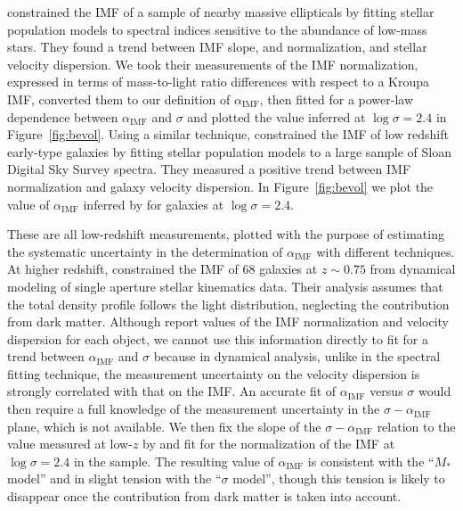 \documentclass[usenatbib, letters]{mnras}
\def\aimf{\alpha_{\mathrm{IMF}}}
\def\Fref#1{Figure~\ref{#1}\xspace}
\begin{document}
{\citet{CvD12} constrained the IMF of a sample of nearby massive ellipticals by fitting stellar population models to spectral indices sensitive to the abundance of low-mass stars. They found a trend between IMF slope, and normalization, and stellar velocity dispersion. We took their measurements of the IMF normalization, expressed in terms of mass-to-light ratio differences with respect to a Kroupa IMF, converted them to our definition of $\aimf$, then fitted for a power-law dependence between $\aimf$ and $\sigma$ and plotted the value inferred at $\log{\sigma}=2.4$ in \Fref{fig:bevol}.
Using a similar technique, \citet{Spi++14} constrained the IMF of low redshift early-type galaxies by fitting stellar population models to a large sample of Sloan Digital Sky Survey spectra.
They measured a positive trend between IMF normalization and galaxy velocity dispersion. In \Fref{fig:bevol} we plot the value of $\aimf$ inferred by \citet{Spi++14} for galaxies at $\log{\sigma} = 2.4$.

These are all low-redshift measurements, plotted with the purpose of estimating the systematic uncertainty in the determination of $\aimf$ with different techniques.
At higher redshift, \citet{S+C14} constrained the IMF of 68 galaxies at $z\sim0.75$ from dynamical modeling of single aperture stellar kinematics data. %
Their analysis assumes that the total density profile follows the light distribution, neglecting the contribution from dark matter.
Although \citet{S+C14} report values of the IMF normalization and velocity dispersion for each object, we cannot use this information directly to fit for a trend between $\aimf$ and $\sigma$ because in dynamical analysis, unlike in the spectral fitting technique, the measurement uncertainty on the velocity dispersion is strongly correlated with that on the IMF. 
An accurate fit of $\aimf$ versus $\sigma$ would then require a full knowledge of the measurement uncertainty in the $\sigma-\aimf$ plane, which is not available. 
We then fix the slope of the $\sigma-\aimf$ relation to the value measured at low-$z$ by \citet{Spi++14} and fit for the normalization of the IMF at $\log{\sigma}=2.4$ in the \citet{S+C14} sample. 
The resulting value of $\aimf$ is consistent with the ``$M_*$ model'' and in slight tension with the ``$\sigma$ model'', though this tension is likely to disappear once the contribution from dark matter is taken into account.

}
\end{document}
